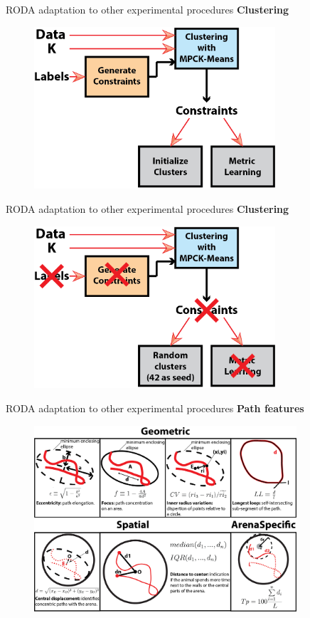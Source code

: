\documentclass{beamer}
\begin{document}
{\begin{frame}{RODA adaptation to other experimental procedures}
	\textbf{Clustering}
	\begin{figure}[H]
		\centering
		\includegraphics[width=0.8\textwidth]{figures/procMPCKmeans2}
	\end{figure}
\end{frame}
\begin{frame}{RODA adaptation to other experimental procedures}
	\textbf{Clustering}
	\begin{figure}[H]
		\centering
		\includegraphics[width=0.8\textwidth]{figures/procMPCKmeans3}
	\end{figure}
\end{frame}

\begin{frame}{RODA adaptation to other experimental procedures}
	\textbf{Path features}
	\begin{figure}[H]
		\centering
		\includegraphics[width=0.87\textwidth]{figures/features2}
	\end{figure}
\end{frame}

}
\end{document}
